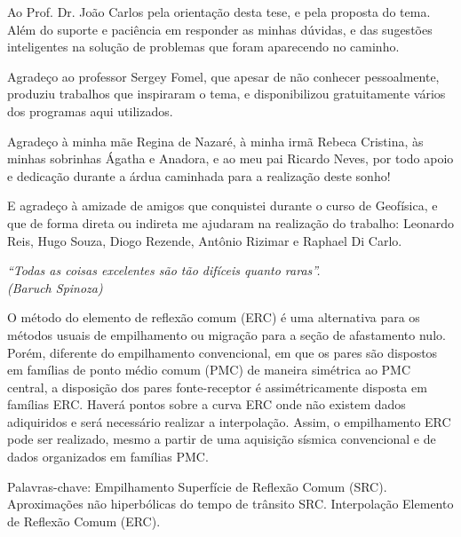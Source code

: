 \documentclass[
	12pt,				%
	openright,			%
	oneside,			%
	a4paper,			%
	english,			%
	brazil				%
	]{abntex2}
\begin{document}
\begin{agradecimentos}
\vspace*{1.5cm}

Ao Prof. Dr. João Carlos pela orientação desta tese, e pela proposta do tema. Além
do suporte e paciência em responder as minhas dúvidas, e das sugestões inteligentes na solução de problemas
que foram aparecendo no caminho.

Agradeço ao professor Sergey Fomel, que apesar de não conhecer pessoalmente, produziu trabalhos
que inspiraram o tema, e disponibilizou gratuitamente
vários
dos programas aqui utilizados.

Agradeço à minha mãe Regina de Nazaré,
à minha irmã Rebeca Cristina, às minhas sobrinhas Ágatha e Anadora, e ao meu pai Ricardo Neves, por todo apoio e dedicação
durante a árdua caminhada para a realização deste sonho!

E agradeço à amizade de amigos que conquistei durante o curso de Geofísica, e que de forma direta ou indireta
me ajudaram na realização do trabalho:
Leonardo Reis, Hugo Souza, Diogo Rezende, Antônio Rizimar e Raphael Di Carlo.

\end{agradecimentos}

\begin{epigrafe}
    \vspace*{\fill}
	\begin{flushright}
		\textit{``Todas as coisas excelentes são tão difíceis quanto raras''. \\
		(Baruch Spinoza)}
	\end{flushright}
\end{epigrafe}


\begin{resumo}
\OnehalfSpacing	%
O método do elemento de reflexão comum (ERC) é uma alternativa para os métodos
usuais de empilhamento ou migração para a seção de afastamento nulo. Porém, diferente do empilhamento 
convencional, em que os pares são dispostos em famílias de ponto médio comum (PMC) de maneira simétrica ao 
PMC central, a disposição dos pares fonte-receptor é assimétricamente disposta em famílias ERC. 
Haverá pontos sobre a curva ERC onde não existem dados adiquiridos e será necessário realizar a interpolação. 
Assim, o empilhamento ERC pode ser realizado, mesmo a partir de uma 
aquisição sísmica convencional e de dados organizados em famílias PMC.
 \vspace{\onelineskip} 
 \noindent
 \par Palavras-chave: Empilhamento Superfície de Reflexão Comum (SRC). Aproximações não hiperbólicas do tempo de trânsito SRC. 
 Interpolação Elemento de Reflexão Comum (ERC). 
\end{resumo}
\end{document}
